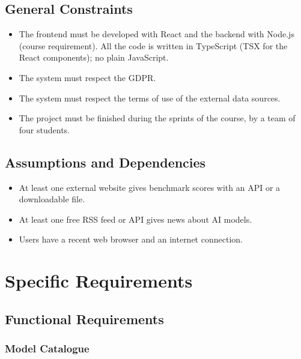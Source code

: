 \documentclass[11pt,a4paper]{article}
\begin{document}
\subsection{General Constraints}

\begin{itemize}
  \item The frontend must be developed with React and the backend with Node.js (course requirement). All the code is written in TypeScript (TSX for the React components); no plain JavaScript.
  \item The system must respect the GDPR.
  \item The system must respect the terms of use of the external data sources.
  \item The project must be finished during the sprints of the course, by a team of four students.
\end{itemize}

\subsection{Assumptions and Dependencies}

\begin{itemize}
  \item At least one external website gives benchmark scores with an API or a downloadable file.
  \item At least one free RSS feed or API gives news about AI models.
  \item Users have a recent web browser and an internet connection.
\end{itemize}

\section{Specific Requirements}

\subsection{Functional Requirements}

\subsubsection{Model Catalogue}
\end{document}
